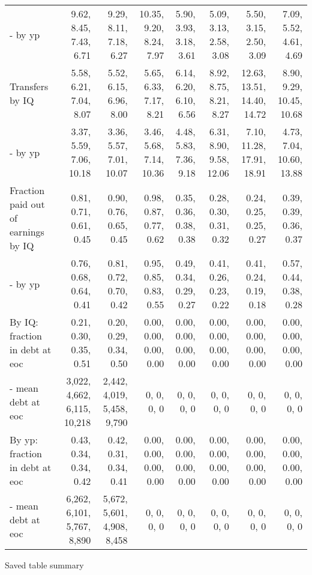 \begin{tabular}{lrrrrrrr}
- by yp & 9.62, 8.45, 7.43, 6.71  & 9.29, 8.11, 7.18, 6.27  & 10.35, 9.20, 8.24, 7.97  & 5.90, 3.93, 3.18, 3.61  & 5.09, 3.13, 2.58, 3.08  & 5.50, 3.15, 2.50, 3.09  & 7.09, 5.52, 4.61, 4.69  \\ 
Transfers by IQ & 5.58, 6.21, 7.04, 8.07  & 5.52, 6.15, 6.96, 8.00  & 5.65, 6.33, 7.17, 8.21  & 6.14, 6.20, 6.10, 6.56  & 8.92, 8.75, 8.21, 8.27  & 12.63, 13.51, 14.40, 14.72  & 8.90, 9.29, 10.45, 10.68  \\ 
- by yp & 3.37, 5.59, 7.06, 10.18  & 3.36, 5.57, 7.01, 10.07  & 3.46, 5.68, 7.14, 10.36  & 4.48, 5.83, 7.36, 9.18  & 6.31, 8.90, 9.58, 12.06  & 7.10, 11.28, 17.91, 18.91  & 4.73, 7.04, 10.60, 13.88  \\ 
Fraction paid out of earnings by IQ & 0.81, 0.71, 0.61, 0.45  & 0.90, 0.76, 0.65, 0.45  & 0.98, 0.87, 0.77, 0.62  & 0.35, 0.36, 0.38, 0.38  & 0.28, 0.30, 0.31, 0.32  & 0.24, 0.25, 0.25, 0.27  & 0.39, 0.39, 0.36, 0.37  \\ 
- by yp & 0.76, 0.68, 0.64, 0.41  & 0.81, 0.72, 0.70, 0.42  & 0.95, 0.85, 0.83, 0.55  & 0.49, 0.34, 0.29, 0.27  & 0.41, 0.26, 0.23, 0.22  & 0.41, 0.24, 0.19, 0.18  & 0.57, 0.44, 0.38, 0.28  \\ 
By IQ: fraction in debt at eoc & 0.21, 0.30, 0.35, 0.51  & 0.20, 0.29, 0.34, 0.50  & 0.00, 0.00, 0.00, 0.00  & 0.00, 0.00, 0.00, 0.00  & 0.00, 0.00, 0.00, 0.00  & 0.00, 0.00, 0.00, 0.00  & 0.00, 0.00, 0.00, 0.00  \\ 
- mean debt at eoc & 3,022, 4,662, 6,115, 10,218  & 2,442, 4,019, 5,458, 9,790  & 0, 0, 0, 0  & 0, 0, 0, 0  & 0, 0, 0, 0  & 0, 0, 0, 0  & 0, 0, 0, 0  \\ 
By yp: fraction in debt at eoc & 0.43, 0.34, 0.34, 0.42  & 0.42, 0.31, 0.34, 0.41  & 0.00, 0.00, 0.00, 0.00  & 0.00, 0.00, 0.00, 0.00  & 0.00, 0.00, 0.00, 0.00  & 0.00, 0.00, 0.00, 0.00  & 0.00, 0.00, 0.00, 0.00  \\ 
- mean debt at eoc & 6,262, 6,101, 5,767, 8,890  & 5,672, 5,601, 4,908, 8,458  & 0, 0, 0, 0  & 0, 0, 0, 0  & 0, 0, 0, 0  & 0, 0, 0, 0  & 0, 0, 0, 0  \\ 
\hline
\end{tabular}%
Saved table summary

